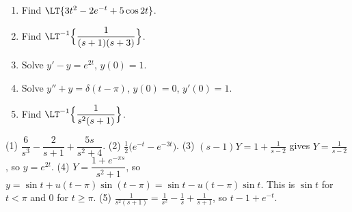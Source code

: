 \begin{practicebox}
\begin{enumerate}
  \item Find $\LT\{3t^2 - 2e^{-t} + 5\cos 2t\}$.
  \item Find $\LT^{-1}\Big\{\dfrac{1}{(s+1)(s+3)}\Big\}$.
  \item Solve $y' - y = e^{2t}$, \; $y(0) = 1$.
  \item Solve $y'' + y = \delta(t-\pi)$, \; $y(0)=0$, \; $y'(0)=1$.
  \item Find $\LT^{-1}\Big\{\dfrac{1}{s^2(s+1)}\Big\}$.
\end{enumerate}
\end{practicebox}

\begin{answerbox}
(1) $\dfrac{6}{s^3} - \dfrac{2}{s+1} + \dfrac{5s}{s^2+4}$. \quad (2) $\tfrac12\big(e^{-t} - e^{-3t}\big)$. \quad (3) $(s-1)Y = 1 + \frac1{s-2}$ gives $Y = \frac1{s-2}$, so $y = e^{2t}$. \quad (4) $Y = \dfrac{1 + e^{-\pi s}}{s^2+1}$, so $y = \sin t + u(t-\pi)\sin(t-\pi) = \sin t - u(t-\pi)\sin t$. This is $\sin t$ for $t<\pi$ and $0$ for $t\ge\pi$. \quad (5) $\frac{1}{s^2(s+1)} = \frac1{s^2} - \frac1s + \frac1{s+1}$, so $t - 1 + e^{-t}$.
\end{answerbox}
